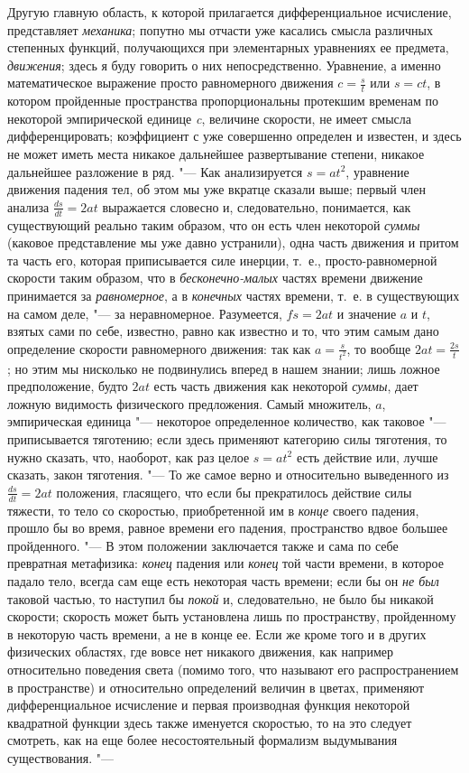 Другую главную область, к которой прилагается дифференциальное исчисление,
представляет {\em механика}; попутно мы отчасти уже
касались смысла различных степенных функций, получающихся при элементарных
уравнениях ее предмета, {\em движения}; здесь я буду
говорить о них непосредственно. Уравнение, а именно математическое
выражение просто равномерного движения $c=\frac s t$ или $s=ct$,
в котором пройденные пространства пропорциональны протекшим временам по
некоторой эмпирической единице {\em c}, величине
скорости, не имеет смысла дифференцировать; коэффициент с уже совершенно
определен и известен, и здесь не может иметь места никакое дальнейшее
развертывание степени, никакое дальнейшее разложение в ряд. "--- Как
анализируется $s=at^2$, уравнение движения падения тел, об этом мы уже
вкратце сказали выше; первый член анализа 
$\frac{ds}{dt}=2at$ выражается словесно и,
следовательно, понимается, как существующий реально таким образом, что он
есть член некоторой {\em суммы} (каковое представление
мы уже давно устранили), одна часть движения и притом та часть его, которая
приписывается силе инерции, т.~е., просто-равномерной скорости таким
образом, что в {\em бесконечно-малых} частях времени
движение принимается за {\em равномерное}, а в
{\em конечных} частях времени, т.~е. в существующих на
самом деле, "--- за неравномерное. Разумеется, $fs=2at$ и
значение $a$ и $t$, взятых
сами по себе, известно, равно как известно и то, что этим самым дано
определение скорости равномерного движения: так как $a=\frac s{t^2}$, то
вообще $2at=\frac{2s} t$; но этим мы нисколько не подвинулись
вперед в нашем знании; лишь ложное предположение, будто $2at$ 
есть часть движения как некоторой {\em суммы}, дает
ложную видимость физического предложения. Самый множитель,
$a$, эмпирическая единица "--- некоторое определенное
количество, как таковое "--- приписывается тяготению; если здесь применяют
категорию силы тяготения, то нужно сказать, что, наоборот, как раз целое 
$s=at^2$ есть действие или, лучше сказать, закон тяготения. "--- То же самое
верно и относительно выведенного из 
$\frac{ds}{dt}=2at$ положения, гласящего, что
если бы прекратилось действие силы тяжести, то тело со скоростью,
приобретенной им в {\em конце} своего падения, прошло
бы во время, равное времени его падения, пространство вдвое большее
пройденного. "--- В этом положении заключается также и сама по себе превратная
метафизика: {\em конец} падения или
{\em конец} той части времени, в которое падало тело,
всегда сам еще есть некоторая часть времени; если бы он
{\em не был} таковой частью, то наступил бы
{\em покой} и, следовательно, не было бы никакой
скорости; скорость может быть установлена лишь по пространству, пройденному
в некоторую часть времени, а не в конце ее. Если же кроме того и в других
физических областях, где вовсе нет никакого движения, как например
относительно поведения света (помимо того, что называют его
распространением в пространстве) и относительно определений величин в
цветах, применяют дифференциальное исчисление и первая производная функция
некоторой квадратной функции здесь также именуется скоростью, то на это
следует смотреть, как на еще более несостоятельный формализм выдумывания
существования. "---

